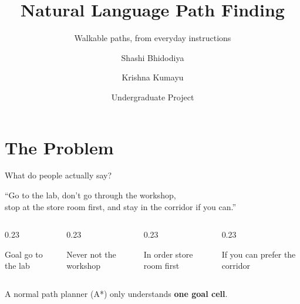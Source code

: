 \documentclass[aspectratio=169]{beamer}
\title{Natural Language Path Finding}
\subtitle{Walkable paths, from everyday instructions}
\author{Shashi Bhidodiya \and Krishna Kumayu}
\institute{Supervisor: Prof.\ Indranil Saha \\ Dept.\ of CSE, IIT Kanpur}
\date{Undergraduate Project}
\begin{document}
\begin{frame}
  \titlepage
\end{frame}

\section{The Problem}

\begin{frame}{What do people actually say?}
  \begin{center}
    \large
    ``Go to the \alert{lab}, don't go through the \alert{workshop},\\
    stop at the \alert{store room} first, and stay in the \alert{corridor}
    if you can.''
  \end{center}
  \vspace{1em}
  \begin{columns}[T]
    \begin{column}{0.23\textwidth}
      \begin{block}{Goal}
        go to the lab
      \end{block}
    \end{column}
    \begin{column}{0.23\textwidth}
      \begin{block}{Never}
        not the workshop
      \end{block}
    \end{column}
    \begin{column}{0.23\textwidth}
      \begin{block}{In order}
        store room first
      \end{block}
    \end{column}
    \begin{column}{0.23\textwidth}
      \begin{block}{If you can}
        prefer the corridor
      \end{block}
    \end{column}
  \end{columns}
  \vspace{1em}
  A normal path planner (A*) only understands \textbf{one goal cell}.
\end{frame}
\end{document}
